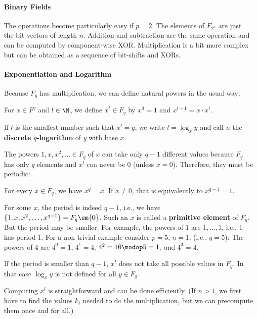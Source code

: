 \paragraph{Binary Fields}
The operations become particularly easy if $p=2$.
The elements of $F_{2^n}$ are just the bit vectors of length $n$.
Addition and subtraction are the same operation and can be computed by component-wise XOR.
Multiplication is a bit more complex but can be obtained as a sequence of bit-shifts and XORs.

\paragraph{Exponentiation and Logarithm}
Because $F_q$ has multiplication, we can define natural powers in the usual way:

\begin{definition}
For $x\in F^q$ and $l\in\N$, we define $x^l\in F_q$ by $x^0=1$ and $x^{l+1}=x\cdot x^l$.

If $l$ is the smallest number such that $x^l=y$, we write $l=\log_x y$ and call $n$ the \textbf{discrete $q$-logarithm} of $y$ with base $x$.
\end{definition}

The powers $1,x,x^2,\ldots\in F_q$ of $x$ can take only $q-1$ different values because $F_q$ has only $q$ elements and $x^l$ can never be $0$ (unless $x=0$).
Therefore, they must be periodic:

\begin{theorem}
For every $x\in F_q$, we have $x^q=x$. If $x\neq 0$, that is equivalently to $x^{q-1}=1$.
\end{theorem}

For some $x$, the period is indeed $q-1$, i.e., we have $\{1,x,x^2,\ldots,x^{q-1}\}=F_q\sm\{0\}$.
Such an $x$ is called a \textbf{primitive element} of $F_q$.
But the period may be smaller.
For example, the powers of $1$ are $1,\ldots,1$, i.e., $1$ has period $1$.
For a non-trivial example consider $p=5$, $n=1$, (i.e., $q=5$): The powers of $4$ are $4^0=1$, $4^1=4$, $4^2=16\modop 5=1$, and $4^3=4$.

If the period is smaller than $q-1$, $x^l$ does not take all possible values in $F_q$.
In that case $\log_x y$ is not defined for all $y\in F_q$.
\medskip

Computing $x^l$ is straightforward and can be done efficiently.
(If $n>1$, we first have to find the values $k_i$ needed to do the multiplication, but we can precompute them once and for all.)

